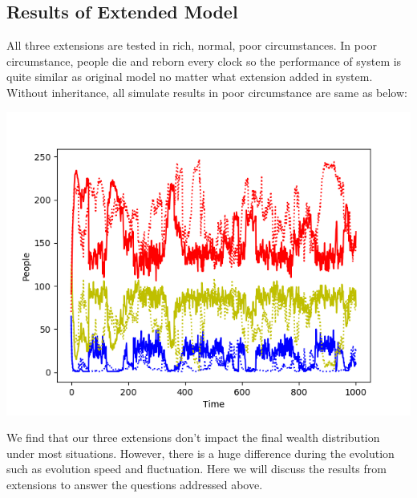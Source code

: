 \subsection{Results of Extended Model}
All three extensions are tested in rich, normal, poor circumstances.  In poor circumstance,  people die and reborn every clock so the performance of system is quite similar as original model no matter what extension added in system. Without inheritance, all simulate results in poor circumstance are same as below: 
\begin{center}
	\includegraphics[scale=0.5]{poor.png}
\end{center}
We find that our three extensions don't impact the final wealth distribution under most situations. However, there is a huge difference during the evolution such as evolution speed and fluctuation. Here we will discuss the results from extensions to answer the questions addressed above. 
